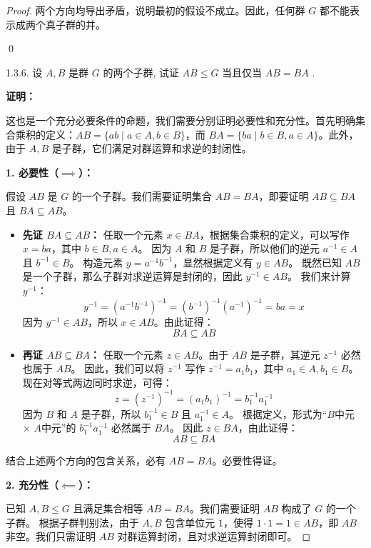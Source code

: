\documentclass[]{article}
\begin{document}
\begin{proof}
两个方向均导出矛盾，说明最初的假设不成立。因此，任何群 $G$ 都不能表示成两个真子群的并。

\qed

1.3.6. 设 $A, B$ 是群 $G$ 的两个子群, 试证 $AB \leqslant G$ 当且仅当 $AB = BA$ . 

\bigskip
\noindent \textbf{证明：} 

这也是一个充分必要条件的命题，我们需要分别证明必要性和充分性。首先明确集合乘积的定义：$AB = \{ab \mid a \in A, b \in B\}$，而 $BA = \{ba \mid b \in B, a \in A\}$。此外，由于 $A, B$ 是子群，它们满足对群运算和求逆的封闭性。

\bigskip
\noindent \textbf{1. 必要性（$\implies$）：}

假设 $AB$ 是 $G$ 的一个子群。我们需要证明集合 $AB = BA$，即要证明 $AB \subseteq BA$ 且 $BA \subseteq AB$。

\begin{itemize}
	\item \textbf{先证 $BA \subseteq AB$：}
	任取一个元素 $x \in BA$，根据集合乘积的定义，可以写作 $x = ba$，其中 $b \in B, a \in A$。
	因为 $A$ 和 $B$ 是子群，所以他们的逆元 $a^{-1} \in A$ 且 $b^{-1} \in B$。
	构造元素 $y = a^{-1}b^{-1}$，显然根据定义有 $y \in AB$。
	既然已知 $AB$ 是一个子群，那么子群对求逆运算是封闭的，因此 $y^{-1} \in AB$。
	我们来计算 $y^{-1}$：
	\[ y^{-1} = (a^{-1}b^{-1})^{-1} = (b^{-1})^{-1}(a^{-1})^{-1} = ba = x \]
	因为 $y^{-1} \in AB$，所以 $x \in AB$。由此证得：
	\[ BA \subseteq AB \]
	
	\item \textbf{再证 $AB \subseteq BA$：}
	任取一个元素 $z \in AB$。由于 $AB$ 是子群，其逆元 $z^{-1}$ 必然也属于 $AB$。
	因此，我们可以将 $z^{-1}$ 写作 $z^{-1} = a_1 b_1$，其中 $a_1 \in A, b_1 \in B$。
	现在对等式两边同时求逆，可得：
	\[ z = (z^{-1})^{-1} = (a_1 b_1)^{-1} = b_1^{-1} a_1^{-1} \]
	因为 $B$ 和 $A$ 是子群，所以 $b_1^{-1} \in B$ 且 $a_1^{-1} \in A$。
	根据定义，形式为“$B$中元 $\times$ $A$中元”的 $b_1^{-1} a_1^{-1}$ 必然属于 $BA$。
	因此 $z \in BA$，由此证得：
	\[ AB \subseteq BA \]
\end{itemize}

结合上述两个方向的包含关系，必有 $AB = BA$。必要性得证。

\bigskip
\noindent \textbf{2. 充分性（$\impliedby$）：}

已知 $A, B \leqslant G$ 且满足集合相等 $AB = BA$。我们需要证明 $AB$ 构成了 $G$ 的一个子群。
根据子群判别法，由于 $A, B$ 包含单位元 $1$，使得 $1 \cdot 1 = 1 \in AB$，即 $AB$ 非空。我们只需证明 $AB$ 对群运算封闭，且对求逆运算封闭即可。


\end{proof}
\end{document}
